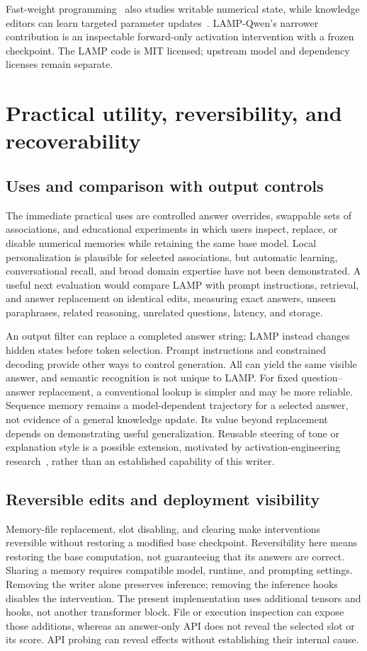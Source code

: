 \documentclass[manuscript,screen,nonacm]{acmart}
\begin{document}
Fast-weight programming~\cite{fastweights} also studies writable numerical state, while knowledge editors can learn targeted parameter updates~\cite{editing}. LAMP-Qwen's narrower contribution is an inspectable forward-only activation intervention with a frozen checkpoint. The LAMP code is MIT licensed; upstream model and dependency licenses remain separate.



\section{Practical utility, reversibility, and recoverability}
\subsection{Uses and comparison with output controls}
The immediate practical uses are controlled answer overrides, swappable sets of associations, and educational experiments in which users inspect, replace, or disable numerical memories while retaining the same base model. Local personalization is plausible for selected associations, but automatic learning, conversational recall, and broad domain expertise have not been demonstrated. A useful next evaluation would compare LAMP with prompt instructions, retrieval, and answer replacement on identical edits, measuring exact answers, unseen paraphrases, related reasoning, unrelated questions, latency, and storage.

An output filter can replace a completed answer string; LAMP instead changes hidden states before token selection. Prompt instructions and constrained decoding provide other ways to control generation. All can yield the same visible answer, and semantic recognition is not unique to LAMP. For fixed question--answer replacement, a conventional lookup is simpler and may be more reliable. Sequence memory remains a model-dependent trajectory for a selected answer, not evidence of a general knowledge update. Its value beyond replacement depends on demonstrating useful generalization. Reusable steering of tone or explanation style is a possible extension, motivated by activation-engineering research~\cite{actadd}, rather than an established capability of this writer.

\subsection{Reversible edits and deployment visibility}
Memory-file replacement, slot disabling, and clearing make interventions reversible without restoring a modified base checkpoint. Reversibility here means restoring the base computation, not guaranteeing that its answers are correct. Sharing a memory requires compatible model, runtime, and prompting settings. Removing the writer alone preserves inference; removing the inference hooks disables the intervention. The present implementation uses additional tensors and hooks, not another transformer block. File or execution inspection can expose those additions, whereas an answer-only API does not reveal the selected slot or its score. API probing can reveal effects without establishing their internal cause.
\end{document}
